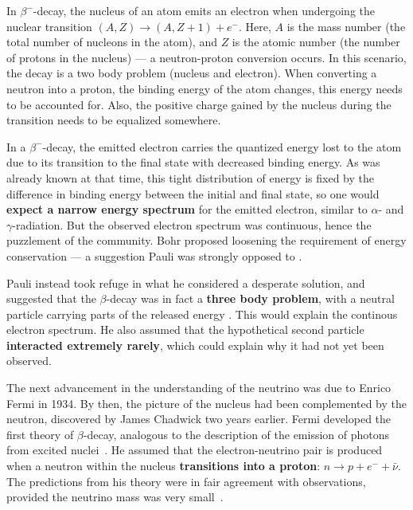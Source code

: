 In $\beta^-$-decay, the nucleus of an atom emits an electron when undergoing the nuclear transition $(A,Z)\rightarrow(A,Z+1) + e^-$. Here, $A$ is the mass number (the total number of nucleons in the atom), and $Z$ is the atomic number (the number of protons in the nucleus) --- a neutron-proton conversion occurs. In this scenario, the decay is a two body problem (nucleus and electron). When converting a neutron into a proton, the binding energy of the atom changes, this energy needs to be accounted for. Also, the positive charge gained by the nucleus during the transition needs to be equalized somewhere.

In a $\beta^-$-decay, the emitted electron carries the quantized energy lost to the atom due to its transition to the final state with decreased binding energy. As was already known at that time, this tight distribution of energy is fixed by the difference in binding energy between the initial and final state, so one would \textbf{expect a narrow energy spectrum} for the emitted electron, similar to $\alpha$- and $\gamma$-radiation. But the observed electron spectrum was continuous, hence the puzzlement of the community. Bohr proposed loosening the requirement of energy conservation --- a suggestion Pauli was strongly opposed to .

Pauli instead took refuge in what he considered a desperate solution, and suggested that the $\beta$-decay was in fact a \textbf{three body problem}, with a neutral particle carrying parts of the released energy . This would explain the continous electron spectrum. He also assumed that the hypothetical second particle \textbf{interacted extremely rarely}, which could explain why it had not yet been observed.

The next advancement in the understanding of the neutrino was due to Enrico Fermi in 1934. By then, the picture of the nucleus had been complemented by the neutron, discovered by James Chadwick two years earlier. Fermi developed the first theory of $\beta$-decay, analogous to the description of the emission of photons from excited nuclei~\cite{Fermi1934}. He assumed that the electron-neutrino pair is produced when a neutron within the nucleus \textbf{transitions into a proton}: $n \rightarrow p + e^- + \bar{\nu}$. The predictions from his theory were in fair agreement with observations, provided the neutrino mass was very small~\cite{Fermi1934}.

